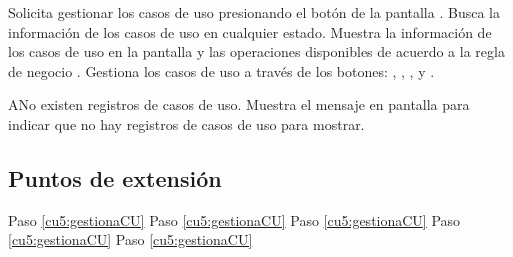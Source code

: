  \begin{UCtrayectoria}
    \UCpaso[\UCactor] Solicita gestionar los casos de uso presionando el botón \btnCU de la pantalla .
    \UCpaso[\UCsist] Busca la información de los casos de uso en cualquier estado. 
    \UCpaso[\UCsist] Muestra la información de los casos de uso en la pantalla  y las operaciones 
    disponibles de acuerdo a la regla de negocio . 
    \UCpaso[\UCactor] Gestiona los casos de uso a través de los botones: \btnRevisar, , \btnConsulta, \btnEditar y \btnEliminar. \label{cu5:gestionaCU}
 \end{UCtrayectoria}
 
 \begin{UCtrayectoriaA}{A}{No existen registros de casos de uso.}
    \UCpaso[\UCsist] Muestra el mensaje  en pantalla  
    para indicar que no hay registros de casos de uso para mostrar.
 \end{UCtrayectoriaA}
 

\subsection{Puntos de extensión}

	{Paso \ref{cu5:gestionaCU}}
	{}
	{Paso \ref{cu5:gestionaCU}}
	{}	
	{Paso \ref{cu5:gestionaCU}}
	{}
	{Paso \ref{cu5:gestionaCU}}
	{}
	{Paso \ref{cu5:gestionaCU}}
	{}
  